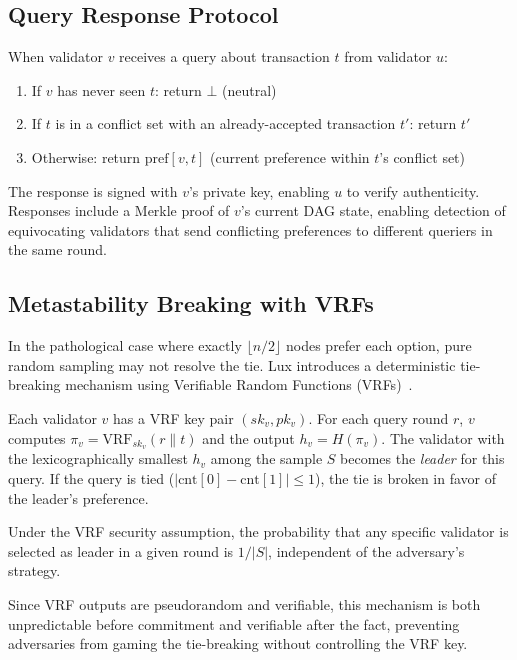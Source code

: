 \subsection{Query Response Protocol}

When validator $v$ receives a query about transaction $t$ from validator $u$:
\begin{enumerate}
\item If $v$ has never seen $t$: return $\bot$ (neutral)
\item If $t$ is in a conflict set with an already-accepted transaction $t'$: return $t'$
\item Otherwise: return $\text{pref}[v, t]$ (current preference within $t$'s conflict set)
\end{enumerate}

The response is signed with $v$'s private key, enabling $u$ to verify authenticity.
Responses include a Merkle proof of $v$'s current DAG state, enabling detection of
equivocating validators that send conflicting preferences to different queriers in the
same round.

\subsection{Metastability Breaking with VRFs}

In the pathological case where exactly $\lfloor n/2 \rfloor$ nodes prefer each option,
pure random sampling may not resolve the tie. Lux introduces a deterministic tie-breaking
mechanism using Verifiable Random Functions (VRFs)~\cite{micali1999verifiable}.

Each validator $v$ has a VRF key pair $(sk_v, pk_v)$. For each query round $r$, $v$
computes $\pi_v = \text{VRF}_{sk_v}(r \| t)$ and the output $h_v = H(\pi_v)$.
The validator with the lexicographically smallest $h_v$ among the sample $S$ becomes the
\emph{leader} for this query. If the query is tied ($|\text{cnt}[0] - \text{cnt}[1]| \leq 1$),
the tie is broken in favor of the leader's preference.

\begin{proposition}
Under the VRF security assumption, the probability that any specific validator is
selected as leader in a given round is $1/|S|$, independent of the adversary's strategy.
\end{proposition}

Since VRF outputs are pseudorandom and verifiable, this mechanism is both unpredictable
before commitment and verifiable after the fact, preventing adversaries from gaming the
tie-breaking without controlling the VRF key.

